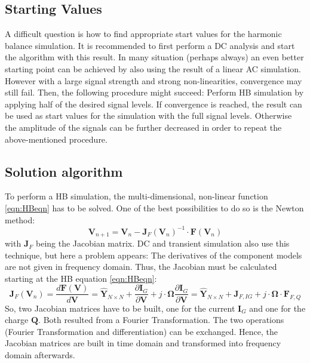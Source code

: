 \subsection{Starting Values}

A difficult question is how to find appropriate start values for the
harmonic balance simulation. It is recommended to first perform a DC
analysis and start the algorithm with this result. In many situation
(perhaps always) an even better starting point can be achieved by
also using the result of a linear AC simulation. However with a large
signal strength and strong non-linearities, convergence may still
fail. Then, the following procedure might succeed: Perform HB
simulation by applying half of the desired signal levels. If convergence
is reached, the result can be used as start values for the simulation
with the full signal levels. Otherwise the amplitude of the signals can
be further decreased in order to repeat the above-mentioned procedure.


\subsection{Solution algorithm}

To perform a HB simulation, the multi-dimensional, non-linear function
\ref{eqn:HBeqn} has to be solved. One of the best possibilities to
do so is the Newton method:
\begin{equation}
\textbf{V}_{n+1} = \textbf{V}_n - \textbf{J}_F (\textbf{V}_n)^{-1}
                   \cdot \textbf{F} (\textbf{V}_n)
\end{equation}
with $\textbf{J}_F$ being the Jacobian matrix. DC and transient
simulation also use this technique, but here a problem appears:
The derivatives of the component models are not given in frequency
domain. Thus, the Jacobian must be calculated starting at the HB
equation \ref{eqn:HBeqn}:
\begin{equation}
\boldsymbol{J}_F (\boldsymbol{V}_n) = \frac{d\boldsymbol{F} (\boldsymbol{V})}{d\boldsymbol{V}}
    = \boldsymbol{\hat{Y}}_{N \times N} + \frac{\partial \boldsymbol{I}_G}{\partial \boldsymbol{V}}
     + j\cdot \boldsymbol{\Omega}\frac{\partial \boldsymbol{I}_G}{\partial \boldsymbol{V}}
    = \boldsymbol{\hat{Y}}_{N \times N} + \boldsymbol{J}_{F,IG}
     + j\cdot \boldsymbol{\Omega}\cdot\boldsymbol{F}_{F,Q}
\end{equation}
So, two Jacobian matrices have to be built, one for the current
$\boldsymbol{I}_G$ and one for the charge $\boldsymbol{Q}$. Both resulted
from a Fourier Transformation. The two operations (Fourier Transformation
and differentiation) can be exchanged. Hence, the Jacobian matrices
are built in time domain and transformed into frequency domain afterwards.

